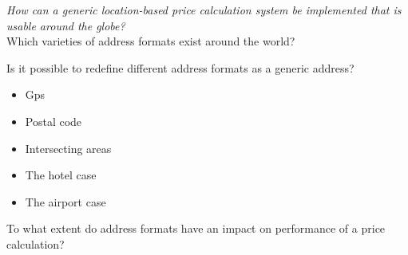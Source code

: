 \textit{How can a generic location-based price calculation system be implemented that is usable around the globe?} \\

Which varieties of address formats exist around the world?

Is it possible to redefine different address formats as a generic address?

\begin{itemize}
  \item Gps
  \item Postal code
  \item Intersecting areas
  \item The hotel case
  \item The airport case
\end{itemize}

To what extent do address formats have an impact on performance of a price calculation?

